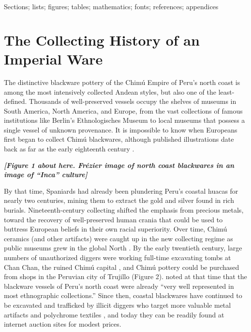 \documentclass[]{interact}
\theoremstyle{plain}%
\theoremstyle{definition}
\theoremstyle{remark}
\begin{document}
\begin{keywords}
Sections; lists; figures; tables; mathematics; fonts; references;
appendices
\end{keywords}

\hypertarget{the-collecting-history-of-an-imperial-ware}{%
\section{The Collecting History of an Imperial
Ware}\label{the-collecting-history-of-an-imperial-ware}}

The distinctive blackware pottery of the Chimú Empire of Peru's north
coast is among the most intensively collected Andean styles, but also
one of the least-defined. Thousands of well-preserved vessels occupy the
shelves of museums in South America, North America, and Europe, from the
vast collections of famous institutions like Berlin's Ethnologisches
Museum to local museums that possess a single vessel of unknown
provenance. It is impossible to know when Europeans first began to
collect Chimú blackwares, although published illustrations date back as
far as the early eighteenth century \citep[Figure 1]{RN11149t}.

\emph{\textbf{{[}Figure 1 about here. Frézier image of north coast
blackwares in an image of ``Inca'' culture{]}}}

By that time, Spaniards had already been plundering Peru's coastal
huacas for nearly two centuries, mining them to extract the gold and
silver found in rich burials. Nineteenth-century collecting shifted the
emphasis from precious metals, toward the recovery of well-preserved
human crania that could be used to buttress European beliefs in their
own racial superiority. Over time, Chimú ceramics (and other artifacts)
were caught up in the new collecting regime as public museums grew in
the global North \citep[50-51]{RN11150}. By the early twentieth century,
large numbers of unauthorized diggers were working full-time excavating
tombs at Chan Chan, the ruined Chimú capital \citep[15]{RN11151}, and
Chimú pottery could be purchased from shops in the Peruvian city of
Trujillo (Figure 2). \citet[570]{RN11152} noted at that time that the
blackware vessels of Peru's north coast were already ``very well
represented in most ethnographic collections.'' Since then, coastal
blackwares have continued to be excavated and trafficked by illicit
diggers who target more valuable metal artifacts and polychrome textiles
\citep{RN11153}, and today they can be readily found at internet auction
sites for modest prices.
\end{document}
